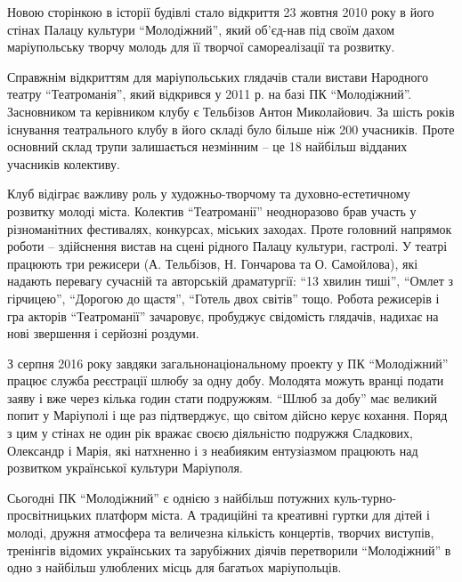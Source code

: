 Новою сторінкою в історії будівлі стало відкриття 23 жовтня 2010 року в його
стінах Палацу культури \enquote{Молодіжний}, який об'єд\hyp{}нав під своїм дахом
маріупольську творчу молодь для її творчої самореалізації та розвитку.

Справжнім відкриттям для маріупольських глядачів стали вистави Народного театру
\enquote{Театроманія}, який відкрився у 2011 р. на базі ПК
\enquote{Молодіжний}. Засновником та керівником клубу є Тельбізов Антон
Миколайович. За шість років існування театрального клубу в його складі було
більше ніж 200 учасників. Проте основний склад трупи залишається незмінним – це
18 найбільш відданих учасників колективу.

Клуб відіграє важливу роль у художньо-творчому та духовно-естетичному розвитку
молоді міста. Колектив \enquote{Театроманії} неодноразово брав участь у різноманітних
фестивалях, конкурсах, міських заходах. Проте головний напрямок роботи –
здійснення вистав на сцені рідного Палацу культури, гастролі. У театрі працюють
три режисери (А. Тельбізов, Н. Гончарова та О. Самойлова), які надають перевагу
сучасній та авторській драматургії: \enquote{13 хвилин тиші}, \enquote{Омлет з гірчицею},
\enquote{Дорогою до щастя}, \enquote{Готель двох світів} тощо. Робота режисерів і гра акторів
\enquote{Театроманії} зачаровує, пробуджує свідомість глядачів, надихає на нові
звершення і серйозні роздуми.

З серпня 2016 року завдяки загальнонаціональному проекту у ПК \enquote{Молодіжний}
працює служба реєстрації шлюбу за одну добу. Молодята можуть вранці подати
заяву і вже через кілька годин стати подружжям. \enquote{Шлюб за добу} має великий
попит у Маріуполі і ще раз підтверджує, що світом дійсно керує кохання. Поряд з
цим у стінах не один рік вражає своєю діяльністю подружжя Сладкових, Олександр
і Марія, які натхненно і з неабияким ентузіазмом працюють над розвитком
української культури Маріуполя.


Сьогодні ПК \enquote{Молодіжний} є однією з найбільш потужних куль\hyp{}турно-просвітницьких
платформ міста. А традиційні та креативні гуртки для дітей і молоді, дружня
атмосфера та величезна кількість концертів, творчих виступів, тренінгів відомих
українських та зарубіжних діячів перетворили \enquote{Молодіжний} в одно з найбільш
улюблених місць для багатьох маріупольців.
